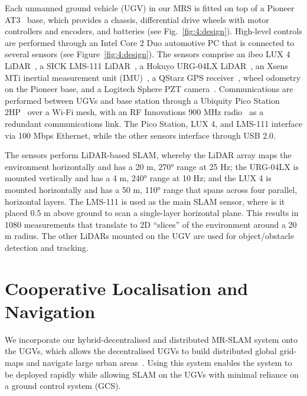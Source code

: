 Each unmanned ground vehicle (UGV) in our MRS is fitted on top of a Pioneer AT3~\cite{adept_technology_inc._pioneer_nodate} base, which provides a chassis, differential drive wheels with motor controllers and encoders, and batteries (see Fig.~\ref{fig:4:design}). High-level controls are performed through an Intel Core 2 Duo automotive PC that is connected to several sensors (see Figure~\ref{fig:4:design}). The sensors comprise an ibeo LUX 4 LiDAR~\cite{autonomoustuff_ibeo_nodate}, a SICK LMS-111 LiDAR~\cite{sick_ag_lms111-10100_nodate}, a Hokuyo URG-04LX LiDAR~\cite{hokuyo_automatic_co._ltd._scanning_nodate}, an Xsens MTi inertial measurement unit (IMU)~\cite{xsens_mti_nodate}, a QStarz GPS receiver~\cite{qstarz_international_co._ltd._bt-q818xt_nodate}, wheel odometry on the Pioneer base, and a Logitech Sphere PZT camera~\cite{logitech_quickcam_nodate}. Communications are performed between UGVs and base station through a Ubiquity Pico Station 2HP~\cite{ubiquiti_networks_picostation2hp_nodate} over a Wi-Fi mesh, with an RF Innovations 900 MHz radio~\cite{sti_engineering_pty_ltd_rfinnovations_nodate} as a redundant communications link. The Pico Station, LUX 4, and LMS-111 interface via 100 Mbps Ethernet, while the other sensors interface through USB 2.0.


The sensors perform LiDAR-based SLAM, whereby the LiDAR array maps the environment horizontally and has a 20 m, \ang{270} range at 25 Hz; the URG-04LX is mounted vertically and has a 4 m, \ang{240} range at 10 Hz; and the LUX 4 is mounted horizontally and has a 50 m, \ang{110} range that spans across four parallel, horizontal layers. The LMS-111 is used as the main SLAM sensor, where is it placed 0.5 m above ground to scan a single-layer horizontal plane. This results in 1080 measurements that translate to 2D ``slices'' of the environment around a 20 m radius. The other LiDARs mounted on the UGV are used for object/obstacle detection and tracking.

\section{Cooperative Localisation and Navigation}\label{sec:4:cln}
We incorporate our hybrid-decentralised and distributed MR-SLAM system onto the UGVs, which allows the decentralised UGVs to build distributed global grid-maps and navigate large urban areas~\cite{r._reid_large-scale_2011, r._reid_cooperative_2013}. Using this system enables the system to be deployed rapidly while allowing SLAM on the UGVs with minimal reliance on a ground control system (GCS).

